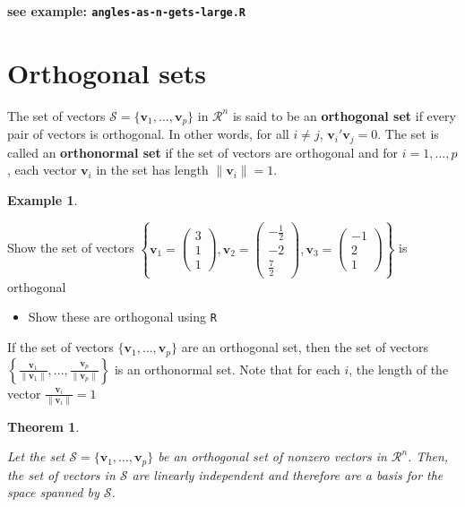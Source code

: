 \documentclass[
]{book}
\providecommand{\tightlist}{%
  \setlength{\itemsep}{0pt}\setlength{\parskip}{0pt}}
\newtheorem{theorem}{Theorem}[chapter]
\theoremstyle{definition}
\theoremstyle{definition}
\newtheorem{example}{Example}[chapter]
\theoremstyle{definition}
\theoremstyle{remark}
\begin{document}
\textbf{see example: \texttt{angles-as-n-gets-large.R}}

\hypertarget{orthogonal-sets}{%
\section{Orthogonal sets}\label{orthogonal-sets}}

The set of vectors \(\mathcal{S} = \{ \mathbf{v}_1, \ldots, \mathbf{v}_p \}\) in \(\mathcal{R}^n\) is said to be an \textbf{orthogonal set} if every pair of vectors is orthogonal. In other words, for all \(i \neq j\), \(\mathbf{v}_i' \mathbf{v}_j = 0\). The set is called an \textbf{orthonormal set} if the set of vectors are orthogonal and for \(i = 1, \ldots, p\), each vector \(\mathbf{v}_i\) in the set has length \(\| \mathbf{v}_i \| = 1\).

\begin{example}
\protect\hypertarget{exm:unlabeled-div-193}{}\label{exm:unlabeled-div-193}

Show the set of vectors \(\left\{ \mathbf{v}_1 = \begin{pmatrix} 3 \\ 1 \\ 1 \end{pmatrix}, \mathbf{v}_2 = \begin{pmatrix} -\frac{1}{2} \\ -2 \\ \frac{7}{2} \end{pmatrix}, \mathbf{v}_3 = \begin{pmatrix} -1 \\ 2 \\ 1 \end{pmatrix} \right\}\) is orthogonal

\begin{itemize}
\tightlist
\item
  Show these are orthogonal using \texttt{R}
\end{itemize}

\end{example}

If the set of vectors \(\{ \mathbf{v}_1, \ldots, \mathbf{v}_p \}\) are an orthogonal set, then the set of vectors \(\left\{ \frac{\mathbf{v}_1}{\|\mathbf{v}_1\|}, \ldots, \frac{\mathbf{v}_p}{\|\mathbf{v}_p\|} \right\}\) is an orthonormal set. Note that for each \(i\), the length of the vector \(\frac{\mathbf{v}_i} {\|\mathbf{v}_i \|} = 1\)

\begin{theorem}
\protect\hypertarget{thm:unlabeled-div-194}{}\label{thm:unlabeled-div-194}

Let the set \(\mathcal{S} = \{ \mathbf{v}_1, \ldots, \mathbf{v}_p \}\) be an orthogonal set of nonzero vectors in \(\mathcal{R}^n\). Then, the set of vectors in \(\mathcal{S}\) are linearly independent and therefore are a basis for the space spanned by \(\mathcal{S}\).

\end{theorem}
\end{document}
